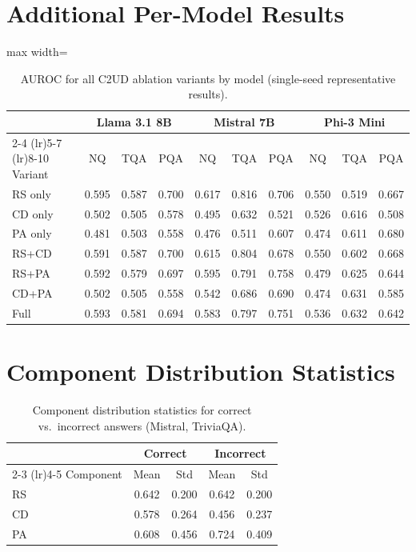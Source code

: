 \documentclass{article}
\newcommand{\ours}{\textsc{C2UD}}
\begin{document}
\newpage
\appendix
\section{Additional Per-Model Results}
\label{app:per_model}

\begin{table}[h]
\caption{AUROC for all \ours{} ablation variants by model (single-seed representative results).}
\label{tab:full_ablation}
\centering
\begin{adjustbox}{max width=\textwidth}
\begin{tabular}{l ccc ccc ccc}
\toprule
& \multicolumn{3}{c}{Llama 3.1 8B} & \multicolumn{3}{c}{Mistral 7B} & \multicolumn{3}{c}{Phi-3 Mini} \\
\cmidrule(lr){2-4} \cmidrule(lr){5-7} \cmidrule(lr){8-10}
Variant & NQ & TQA & PQA & NQ & TQA & PQA & NQ & TQA & PQA \\
\midrule
RS only & 0.595 & 0.587 & 0.700 & 0.617 & 0.816 & 0.706 & 0.550 & 0.519 & 0.667 \\
CD only & 0.502 & 0.505 & 0.578 & 0.495 & 0.632 & 0.521 & 0.526 & 0.616 & 0.508 \\
PA only & 0.481 & 0.503 & 0.558 & 0.476 & 0.511 & 0.607 & 0.474 & 0.611 & 0.680 \\
\midrule
RS+CD & 0.591 & 0.587 & 0.700 & 0.615 & 0.804 & 0.678 & 0.550 & 0.602 & 0.668 \\
RS+PA & 0.592 & 0.579 & 0.697 & 0.595 & 0.791 & 0.758 & 0.479 & 0.625 & 0.644 \\
CD+PA & 0.502 & 0.505 & 0.558 & 0.542 & 0.686 & 0.690 & 0.474 & 0.631 & 0.585 \\
Full & 0.593 & 0.581 & 0.694 & 0.583 & 0.797 & 0.751 & 0.536 & 0.632 & 0.642 \\
\bottomrule
\end{tabular}
\end{adjustbox}
\end{table}

\section{Component Distribution Statistics}
\label{app:components}

\begin{table}[h]
\caption{Component distribution statistics for correct vs.\ incorrect answers (Mistral, TriviaQA).}
\label{tab:component_stats}
\centering
\begin{tabular}{l cc cc}
\toprule
& \multicolumn{2}{c}{Correct} & \multicolumn{2}{c}{Incorrect} \\
\cmidrule(lr){2-3} \cmidrule(lr){4-5}
Component & Mean & Std & Mean & Std \\
\midrule
RS & 0.642 & 0.200 & 0.642 & 0.200 \\
CD & 0.578 & 0.264 & 0.456 & 0.237 \\
PA & 0.608 & 0.456 & 0.724 & 0.409 \\
\bottomrule
\end{tabular}
\end{table}
\end{document}
